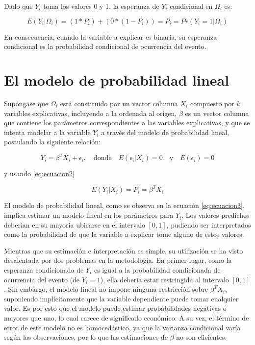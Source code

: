 \documentclass[
  12pt,
]{krantz}
\theoremstyle{definition}
\theoremstyle{definition}
\theoremstyle{definition}
\theoremstyle{remark}
\begin{document}
Dado que \(Y_i\) toma los valores 0 y 1, la esperanza de \(Y_i\) condicional en \(\Omega_i\) es:

\begin{equation}
E(Y_i|\Omega_i)=(1*P_i)+(0*(1-P_i))=P_i=Pr(Y_i=1|\Omega_i)
\label{eq:ecuacion2}
\end{equation}

En consecuencia, cuando la variable a explicar es binaria, su esperanza condicional es la probabilidad condicional de ocurrencia del evento.

\hypertarget{el-modelo-de-probabilidad-lineal}{%
\section{El modelo de probabilidad lineal}\label{el-modelo-de-probabilidad-lineal}}

Supóngase que \(\Omega_i\) está constituido por un vector columna \(X_i\) compuesto por \(k\) variables explicativas, incluyendo a la ordenada al origen, \(\beta\) es un vector columna que contiene los parámetros correspondientes a las variables explicativas, y que se intenta modelar a la variable \(Y_i\) a través del modelo de probabilidad lineal, postulando la siguiente relación:

\[Y_i=\beta^TX_i+\epsilon_i,\quad\textrm{donde}\quad E(\epsilon_i|X_i)=0\quad \textrm{y}\quad E(\epsilon_i)=0 
\label{eq:ecuacion3}\]

y usando \eqref{eq:ecuacion2}

\[E(Y_i|X_i)=P_i=\beta^TX_i
\label{eq:ecuacion4}\]

El modelo de probabilidad lineal, como se observa en la ecuación \eqref{eq:ecuacion3}, implica estimar un modelo lineal en los parámetros para \(Y_i\). Los valores predichos deberían en su mayoría ubicarse en el intervalo \([0,1]\), pudiendo ser interpretados como la probabilidad de que la variable a explicar tome alguno de estos valores.

Mientras que su estimación e interpretación es simple, su utilización se ha visto desalentada por dos problemas en la metodología. En primer lugar, como la esperanza condicionada de \(Y_i\) es igual a la probabilidad condicionada de ocurrencia del evento (de \(Y_i=1\)), ella debería estar restringida al intervalo \([0,1]\). Sin embargo, el modelo lineal no impone ninguna restricción sobre \(\beta^TX_i\), suponiendo implícitamente que la variable dependiente puede tomar cualquier valor. Es por esto que el modelo puede estimar probabilidades negativas o mayores que uno, lo cual carece de significado económico. A su vez, el término de error de este modelo no es homocedástico, ya que la varianza condicional varía según las observaciones, por lo que las estimaciones de \(\beta\) no son eficientes.
\end{document}
